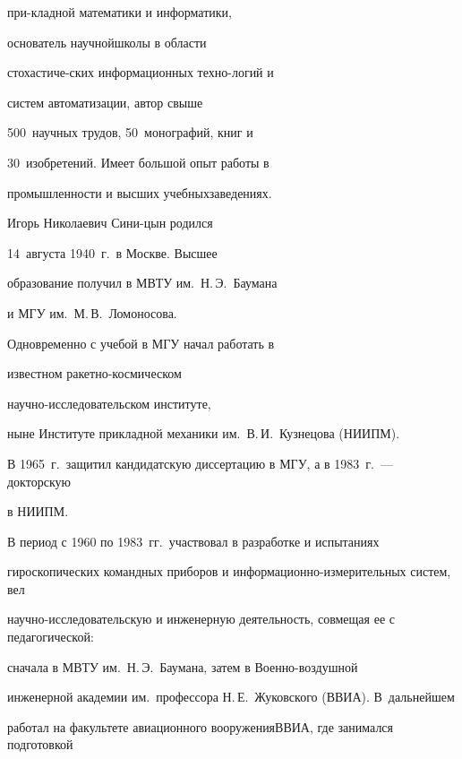при-\linebreak кладной ма\-те\-ма\-ти\-ки и информатики, 

основатель научной\linebreak шко\-лы в области 

стохастиче-\linebreak ских информационных техно-\linebreak логий и 

систем автоматизации, автор свыше 

500~научных трудов, 50~монографий, книг и\linebreak

30~изобретений. Имеет большой опыт работы в 

промышленности и высших учебных\linebreak заведениях.

      

      Игорь Николаевич Сини-\linebreak цын родился 

14~августа 1940~г.\ в Москве. Высшее 

образование получил в МВТУ им.\ Н.\,Э.~Баумана 

и МГУ им.\ М.\,В.~Ломоносова. 

Одновременно с учебой в МГУ начал работать в 

известном ракетно-космическом 

      на\-уч\-но-ис\-сле\-до\-ва\-тель\-ском институте, 

ныне Институте прикладной механики им.\ В.\,И.~Кузнецова (НИИПМ).

      

      В 1965~г.\ защитил кандидатскую диссертацию в МГУ, а в 1983~г.~--- докторскую 

в НИИПМ.

      

      В период с 1960 по 1983~гг.\ участвовал в разработке и испытаниях 

гироскопических командных приборов и информационно-из\-ме\-ри\-тель\-ных систем, вел 

на\-уч\-но-ис\-сле\-до\-ва\-тель\-скую  и инженерную деятельность, совмещая ее с педагогической: 

сначала в МВТУ им.\ Н.\,Э.~Баумана, затем в Военно-воздушной 

инженерной академии им.\ профессора Н.\,Е.~Жуковского (ВВИА). В~дальнейшем 

работал на факультете авиационного вооружения\linebreak ВВИА, где занимался подготовкой 

